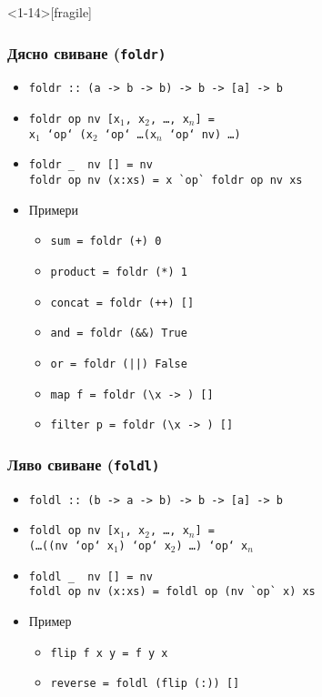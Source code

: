 \documentclass{beamer}
\begin{document}
\begin{frame}<1-14>[fragile]
  \frametitle{Дясно свиване (\tt{foldr})}
  \begin{itemize}[<+->]
  \item \tt{foldr :: (a -> b -> b) -> b -> [a] -> b}
  \item \tt{foldr op nv [x$_1$, x$_2$, \ldots, x$_n$]} = \\
    \tt{x$_1$ `op` (x$_2$ `op` \ldots (x$_n$ `op` nv) \ldots)}
  \item
\begin{verbatim}
foldr _  nv [] = nv
foldr op nv (x:xs) = x `op` foldr op nv xs
\end{verbatim}
  \item Примери
    \begin{itemize}
    \item \tt{sum = foldr (+) 0}
    \item \tt{product = foldr (*) 1}
    \item \tt{concat = foldr (++) []}
    \item \tt{and = foldr (\&\&) True}
    \item \tt{or = foldr (||) False}
    \item \tt{map f = foldr (\textbackslash x -> ) []}
      \onslide<+->
    \item \tt{filter p = foldr (\textbackslash x -> ) []}
    \end{itemize}
  \end{itemize}
\end{frame}

\begin{frame}[fragile]
  \frametitle{Ляво свиване (\tt{foldl})}
  \begin{itemize}[<+->]
  \item \tt{foldl :: (b -> a -> b) -> b -> [a] -> b}
  \item \tt{foldl op nv [x$_1$, x$_2$, \ldots, x$_n$]} = \\
    \tt{(\ldots((nv `op` x$_1$) `op` x$_2$) \ldots ) `op` x$_n$}
  \item
\begin{verbatim}
foldl _  nv [] = nv
foldl op nv (x:xs) = foldl op (nv `op` x) xs
\end{verbatim}
  \item Пример
    \begin{itemize}[<.->]
    \item \tt{flip f x y = f y x}
    \item \tt{reverse = foldl (flip (:)) []}
    \end{itemize}
  \end{itemize}
\end{frame}
\end{document}
